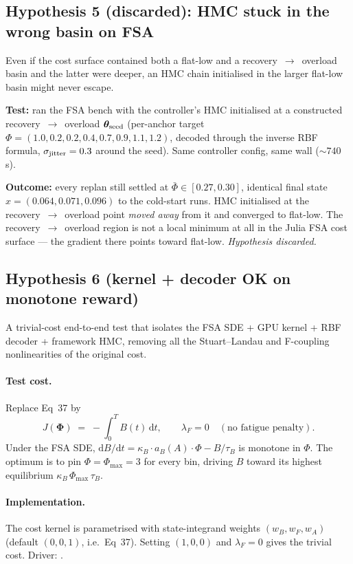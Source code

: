 \documentclass[11pt,a4paper]{article}
\begin{document}
\subsection{Hypothesis 5 (discarded): HMC stuck in the wrong basin on FSA}

Even if the cost surface contained both a flat-low and a
recovery~$\to$~overload basin and the latter were deeper, an
HMC chain initialised in the larger flat-low basin might never escape.

\textbf{Test:} ran the FSA bench with the controller's HMC initialised
at a constructed recovery~$\to$~overload $\bm\theta_{\rm seed}$ (per-anchor
target $\Phi = (1.0, 0.2, 0.2, 0.4, 0.7, 0.9, 1.1, 1.2)$, decoded
through the inverse RBF formula, $\sigma_{\rm jitter}=0.3$ around the
seed). Same controller config, same wall ($\sim 740$\,s).

\textbf{Outcome:} every replan still settled at $\bar\Phi \in [0.27,
0.30]$, identical final state $\hat x = (0.064, 0.071, 0.096)$ to the
cold-start runs. HMC initialised at the recovery~$\to$~overload point
\emph{moved away} from it and converged to flat-low. The
recovery~$\to$~overload region is not a local minimum at all in the
Julia FSA cost surface --- the gradient there points toward flat-low.
\emph{Hypothesis discarded.}

\subsection{Hypothesis 6 (kernel + decoder OK on monotone reward)}

A trivial-cost end-to-end test that isolates the FSA SDE + GPU kernel +
RBF decoder + framework HMC, removing all the Stuart--Landau and
F-coupling nonlinearities of the original cost.

\paragraph{Test cost.} Replace Eq~37 by
\[
J(\bm\Phi) \;=\; -\!\int_0^T B(t)\,\mathrm dt,\qquad \lambda_F = 0
\quad(\text{no fatigue penalty}).
\]
Under the FSA SDE, $\mathrm dB/\mathrm dt = \kappa_B \cdot a_{B}(A) \cdot \Phi
- B/\tau_B$ is monotone in $\Phi$. The optimum is to pin $\Phi=\Phi_{\max}=3$
for every bin, driving $B$ toward its highest equilibrium
$\kappa_B\,\Phi_{\max}\,\tau_B$.

\paragraph{Implementation.} The cost kernel is parametrised with
state-integrand weights $(w_B, w_F, w_A)$ (default $(0,0,1)$, i.e.\ Eq~37).
Setting $(1, 0, 0)$ and $\lambda_F = 0$ gives the trivial cost.
Driver: .
\end{document}
